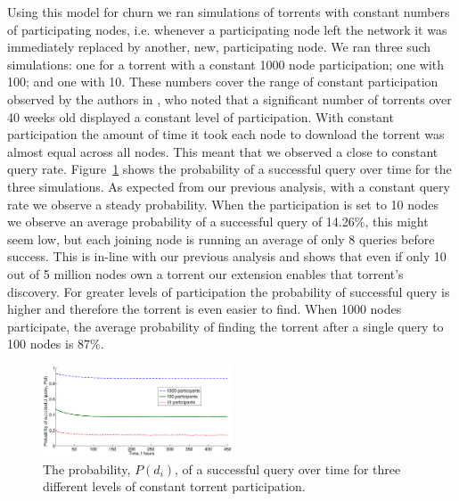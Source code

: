 Using this model for churn we ran simulations of torrents with constant numbers of participating nodes, i.e. whenever a participating node left the network it was immediately replaced by another, new, participating node. We ran three such simulations: one for a torrent with a constant 1000 node participation; one with 100; and one with 10. These numbers cover the range of constant participation observed by the authors in \cite{Gummadi2003}, who noted that a significant number of torrents over 40 weeks old displayed a constant level of participation. With constant participation the amount of time it took each node to download the torrent was almost equal across all nodes. This meant that we observed a close to constant query rate. Figure~\ref{fig:probability_constant_churn} shows the probability of a successful query over time for the three simulations. As expected from our previous analysis, with a constant query rate we observe a steady probability. When the participation is set to 10 nodes we observe an average probability of a successful query of 14.26\%, this might seem low, but each joining node is running an average of only 8 queries before success. This is in-line with our previous analysis and shows that even if only 10 out of 5 million nodes own a torrent our extension enables that torrent's discovery. For greater levels of participation the probability of successful query is higher and therefore the torrent is even easier to find. When 1000 nodes participate, the average probability of finding the torrent after a single query to 100 nodes is 87\%.

\begin{figure}[t]
    \centering
    \includegraphics[width=0.5\textwidth]{Images/ProbabilityConstantChurn.eps}
    \caption{The probability, $P(d_i)$, of a successful query over time for three different levels of constant torrent participation.}
    \label{fig:probability_constant_churn}
\end{figure}

